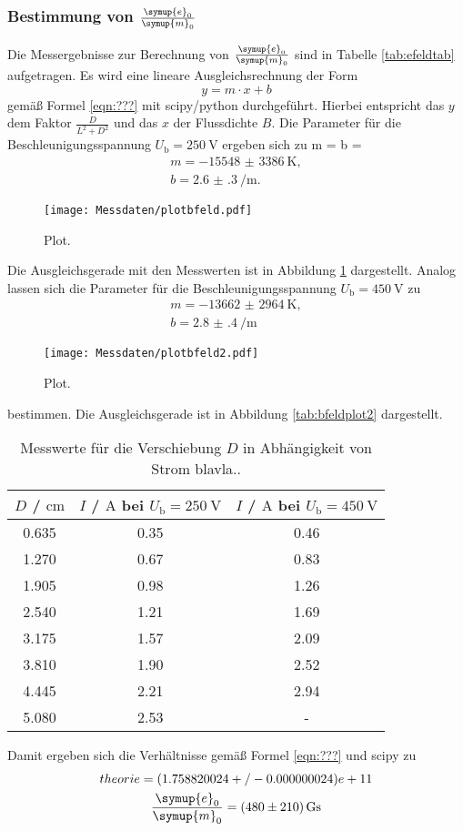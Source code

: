 \subsubsection{Bestimmung von $\frac{\symup{e}_0}{\symup{m}_0}$}
Die Messergebnisse zur Berechnung von $\frac{\symup{e}_0}{\symup{m}_0}$ sind in Tabelle
\ref{tab:efeldtab} aufgetragen. Es wird eine lineare Ausgleichsrechnung der Form
\begin{equation*}
	y = m \cdot x + b
\end{equation*}
gemäß Formel \eqref{eqn:???} mit scipy/python \cite{scipy} durchgeführt. Hierbei entspricht das
$y$ dem Faktor $\frac{D}{L^2+D^2}$ und das $x$ der Flussdichte $B$.
Die Parameter für die Beschleunigungsspannung $U_{\mathrm{b}}=\SI{250}{\volt}$ ergeben sich zu
m = b =  \begin{gather*}
	m = -\SI{15548(3386)}{\kelvin} \mathrm{,} \\
	b = \SI{2.6(3)}{\per\meter} \mathrm{.}
\end{gather*}
\begin{figure}
  \centering
  \texttt{[image: Messdaten/plotbfeld.pdf]}
  \caption{Plot.}
  \label{fig:bfeldplot}
\end{figure}
Die Ausgleichsgerade mit den Messwerten ist in Abbildung \ref{fig:bfeldplot} dargestellt.
Analog lassen sich die Parameter für die Beschleunigungsspannung $U_{\mathrm{b}}=\SI{450}{\volt}$
zu
\begin{gather*}
	m = -\SI{13662(2964)}{\kelvin} \mathrm{,} \\
	b = \SI{2.8(4)}{\per\meter}
\end{gather*}
\begin{figure}
  \centering
  \texttt{[image: Messdaten/plotbfeld2.pdf]}
  \caption{Plot.}
  \label{fig:bfeldplot2}
\end{figure}
bestimmen. Die Ausgleichsgerade ist in Abbildung \ref{tab:bfeldplot2} dargestellt. 
\begin{table}
	\caption{Messwerte für die Verschiebung $D$ in Abhängigkeit von Strom blavla..}
	\label{tab:bfeldtab}
	\centering
	\begin{tabular}{ccc}
	\toprule
		$D$ / $\si{\centi\meter}$ & $I$ / $\si{\ampere}$ bei $U_{\mathrm{b}}=\SI{250}{\volt}$ & $I$ / $\si{\ampere}$ bei $U_{\mathrm{b}}=\SI{450}{\volt}$ \\
	\midrule
		0.635 & 0.35 & 0.46 \\
		1.270 & 0.67 & 0.83 \\
		1.905 & 0.98 & 1.26 \\
		2.540 & 1.21 & 1.69 \\
		3.175 & 1.57 & 2.09 \\
		3.810 & 1.90 & 2.52 \\
		4.445 & 2.21 & 2.94 \\
		5.080 & 2.53 & - \\
	\bottomrule
	\end{tabular}
\end{table}
Damit ergeben sich die Verhältnisse gemäß Formel \eqref{eqn:???} und scipy \cite{scipy} zu
\begin{gather*}
	theorie =  (1.758820024+/-0.000000024)e+11 \\
	\frac{\symup{e}_0}{\symup{m}_0} = \SI{480(210)}{\giga\second}
\end{gather*}
